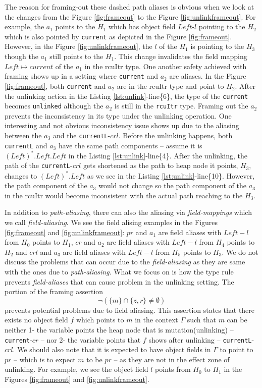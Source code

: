 The reason for framing-out these dashed path aliases is obvious when we look at the changes from the Figure \ref{fig:frameout} to the Figure \ref{fig:unlinkframeout}. For example, the $a_1$ points to the $H_1$ which has object field $Left$-$l$ pointing to the $H_2$ which is also pointed by \texttt{current} as depicted in the Figure \ref{fig:frameout}. However, in the Figure \ref{fig:unlinkframeout}, the $l$ of the $H_1$ is pointing to the $H_3$ though the $a_1$ still points to the $H_1$. This change invalidates the field mapping $Left \mapsto current$ of the $a_1$ in the \textsf{rcuItr} type. One another safety achieved with framing shows up in a setting where \texttt{current} and $a_2$ are aliases. In the Figure \ref{fig:frameout}, both \texttt{current} and $a_2$ are in the \textsf{rcuItr} type and point to $H_2$. After the unlinking action in the Listing \ref{lst:unlink}-line\{6\}, the type of the \texttt{current} becomes \texttt{unlinked} although the $a_2$ is still in the \texttt{rcuItr} type. Framing out the $a_2$ prevents the inconsistency in its type under the unlinking operation. One interesting and not obvious inconsistency issue shows up due to the aliasing between the $a_3$ and the \texttt{currentL}-$crl$. Before the unlinking happens, both \texttt{currentL} and $a_3$ have the same path components -- assume it is $(Left)^{*}.Left.Left$ in the Listing \ref{lst:unlink}-line\{4\}. After the unlinking, the path of the \texttt{currentL}-$crl$ gets shortened as the path to heap node it points, $H_3$, changes  to $(Left)^{*}.Left$ as we see in the Listing \ref{lst:unlink}-line\{10\}. However, the path component of the $a_3$  would not change so the path component of the $a_3$ in the \textsf{rcuItr} would become inconsistent with the actual path reaching to the $H_3$.

In addition to \textit{path-aliasing}, there can also  the aliasing via \textit{field-mappings} which we call \textit{field-aliasing}. We see the field alising examples in the Figures \ref{fig:frameout} and \ref{fig:unlinkframeout}: $pr$ and $a_1$ are field aliases with $Left-l$ from $H_0$ points to $H_1$, $cr$ and $a_2$ are field aliases with $Left-l$ from $H_4$ points to $H_2$  and $crl$ and $a_3$ are field aliases with $Left-l$ from $H_5$ points to $H_3$. We do not discuss the problems that can occur due to the \textit{field-aliasing} as they are same with the ones due to \textit{path-aliasing}. What we focus on is how the type rule prevents \textit{field-aliases} that can cause problem in the unlinking setting. The portion of the framing assertion
\[\lnot(\{m\} \cap \{z,r\} \neq \emptyset  )\]
prevents potential problems due to field aliasing. This assertion states that there exists no object field $f$ which points to $m$ in the context $\Gamma$ such that $m$ can be neither 1- the variable points the heap node that is mutation(unlinking) -- \texttt{current}-$cr$ --  nor 2- the variable points that $f$ shows after unlinking -- \texttt{currentL}-$crl$. We should also note that it is expected to have object fields in $\Gamma$ to point to $pr$ -- which is to expect $m$ to be $pr$ -- as they are not in the effect zone of unlinking. For example, we see the object field $l$ points from $H_0$ to  $H_1$ in the Figures \ref{fig:frameout} and \ref{fig:unlinkframeout}.

